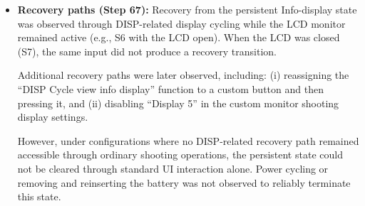 \documentclass[a4paper,10pt]{article}
\begin{document}
\begin{itemize}
    \item \textbf{Recovery paths (Step 67):}
    Recovery from the persistent Info-display state was observed through
    DISP-related display cycling while the LCD monitor remained active
    (e.g., S6 with the LCD open). When the LCD was closed (S7), the same input
    did not produce a recovery transition.

    Additional recovery paths were later observed, including:
    (i) reassigning the ``DISP Cycle view info display'' function to a custom
    button and then pressing it, and
    (ii) disabling ``Display 5'' in the custom monitor shooting display
    settings.

    However, under configurations where no DISP-related recovery path remained
    accessible through ordinary shooting operations, the persistent state could
    not be cleared through standard UI interaction alone. Power cycling or
    removing and reinserting the battery was not observed to reliably terminate
    this state.
\end{itemize}
\end{document}
